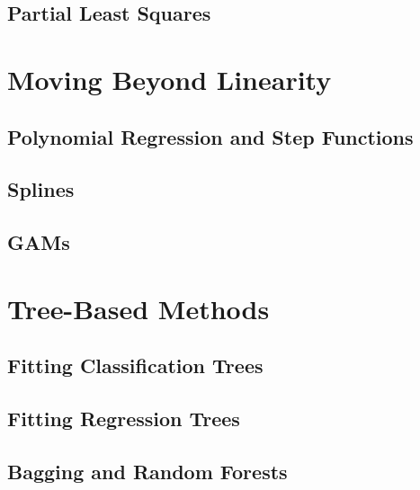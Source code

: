 \documentclass[
]{book}
\begin{document}
\hypertarget{partial-least-squares}{%
\section{Partial Least Squares}\label{partial-least-squares}}

\hypertarget{moving-beyond-linearity}{%
\chapter{Moving Beyond Linearity}\label{moving-beyond-linearity}}

\hypertarget{polynomial-regression-and-step-functions}{%
\section{Polynomial Regression and Step Functions}\label{polynomial-regression-and-step-functions}}

\hypertarget{splines}{%
\section{Splines}\label{splines}}

\hypertarget{gams}{%
\section{GAMs}\label{gams}}

\hypertarget{tree-based-methods}{%
\chapter{Tree-Based Methods}\label{tree-based-methods}}

\hypertarget{fitting-classification-trees}{%
\section{Fitting Classification Trees}\label{fitting-classification-trees}}

\hypertarget{fitting-regression-trees}{%
\section{Fitting Regression Trees}\label{fitting-regression-trees}}

\hypertarget{bagging-and-random-forests}{%
\section{Bagging and Random Forests}\label{bagging-and-random-forests}}
\end{document}
